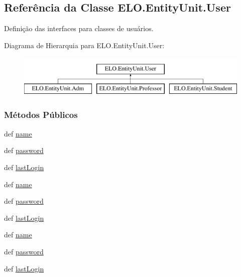 \hypertarget{classELO_1_1EntityUnit_1_1User}{\subsection{Referência da Classe E\-L\-O.\-Entity\-Unit.\-User}
\label{classELO_1_1EntityUnit_1_1User}
}


Definição das interfaces para classes de usuários.  


Diagrama de Hierarquia para E\-L\-O.\-Entity\-Unit.\-User\-:\begin{figure}[H]
\begin{center}
\leavevmode
\includegraphics[height=2.000000cm]{dd/d09/classELO_1_1EntityUnit_1_1User}
\end{center}
\end{figure}
\subsubsection*{Métodos Públicos}
\begin{DoxyCompactItemize}
\item 
def \hyperlink{classELO_1_1EntityUnit_1_1User_ad8e94293952f8018f67b59327900c429}{name}
\item 
def \hyperlink{classELO_1_1EntityUnit_1_1User_a01ae16d257db991dd048c84dba5034c0}{password}
\item 
def \hyperlink{classELO_1_1EntityUnit_1_1User_a96e14d87d9a761c3c71d47dec07e1598}{last\-Login}
\item 
def \hyperlink{classELO_1_1EntityUnit_1_1User_ad8e94293952f8018f67b59327900c429}{name}
\item 
def \hyperlink{classELO_1_1EntityUnit_1_1User_a01ae16d257db991dd048c84dba5034c0}{password}
\item 
def \hyperlink{classELO_1_1EntityUnit_1_1User_a96e14d87d9a761c3c71d47dec07e1598}{last\-Login}
\item 
def \hyperlink{classELO_1_1EntityUnit_1_1User_ad8e94293952f8018f67b59327900c429}{name}
\item 
def \hyperlink{classELO_1_1EntityUnit_1_1User_a01ae16d257db991dd048c84dba5034c0}{password}
\item 
def \hyperlink{classELO_1_1EntityUnit_1_1User_a96e14d87d9a761c3c71d47dec07e1598}{last\-Login}
\end{DoxyCompactItemize}


